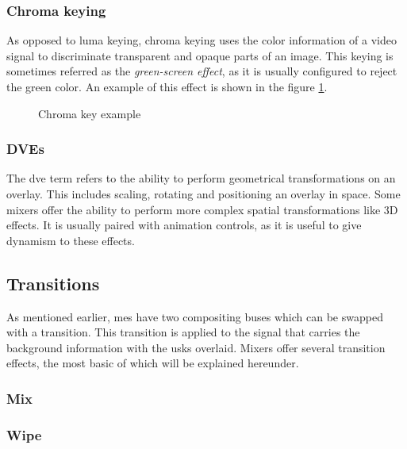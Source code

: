 \documentclass[../main.tex]{subfiles}
\begin{document}
\subsubsection{Chroma keying}
As opposed to luma keying, chroma keying uses the color information of a video signal to discriminate transparent and opaque parts of an image. This keying is sometimes referred as the \textit{green-screen effect}, as it is usually configured to reject the green color\cite{ortizrodriguez2018}. An example of this effect is shown in the figure \ref{fig:chroma_key_example}.\newline

\begin{figure}[hbtp]
    \centering

    \caption{Chroma key example}
    \label{fig:chroma_key_example}
\end{figure}

\subsubsection{DVEs}
The \gls{dve} term refers to the ability to perform geometrical transformations on an overlay. This includes scaling, rotating and positioning an overlay in space. Some mixers offer the ability to perform more complex spatial transformations like 3D effects. It is usually paired with animation controls, as it is useful to give dynamism to these effects.



\subsection{Transitions}
As mentioned earlier, \glspl{me} have two compositing buses which can be swapped with a transition. This transition is applied to the signal that carries the background information with the \glspl{usk} overlaid. Mixers offer several transition effects, the most basic of which will be explained hereunder.

\subsubsection{Mix}

\subsubsection{Wipe}
\end{document}
